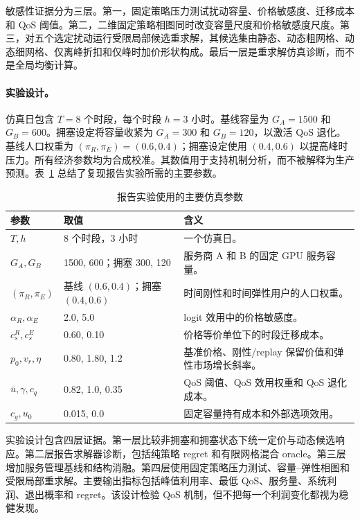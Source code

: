 \documentclass[UTF8,11pt,a4paper]{ctexart}
\begin{document}
敏感性证据分为三层。第一，固定策略压力测试扰动容量、价格敏感度、迁移成本和 QoS 阈值。第二，二维固定策略相图同时改变容量尺度和价格敏感度尺度。第三，对五个选定扰动运行受限局部候选重求解，其候选集由静态、动态粗网格、动态细网格、仅离峰折扣和仅峰时加价形状构成。最后一层是重求解仿真诊断，而不是全局均衡计算。

\paragraph{实验设计。}
\label{sec:setup}

仿真日包含 $T=8$ 个时段，每个时段 $h=3$ 小时。基线容量为 $G_A=1500$ 和 $G_B=600$。拥塞设定将容量收紧为 $G_A=300$ 和 $G_B=120$，以激活 QoS 退化。基线人口权重为 $(\pi_R,\pi_E)=(0.6,0.4)$；拥塞设定使用 $(0.4,0.6)$ 以提高峰时压力。所有经济参数均为合成校准。其数值用于支持机制分析，而不被解释为生产预测。表~\ref{tab:main_parameters} 总结了复现报告实验所需的主要参数。

\begin{table}[H]
\centering
\caption{报告实验使用的主要仿真参数}
\label{tab:main_parameters}
\small
\begin{tabular}{p{}p{}p{}}
\toprule
参数 & 取值 & 含义 \\
\midrule
$T,h$ & 8 个时段，3 小时 & 一个仿真日。 \\
$G_A,G_B$ & 1500, 600；拥塞 300, 120 & 服务商 A 和 B 的固定 GPU 服务容量。 \\
$(\pi_R,\pi_E)$ & 基线 $(0.6,0.4)$；拥塞 $(0.4,0.6)$ & 时间刚性和时间弹性用户的人口权重。 \\
$\alpha_R,\alpha_E$ & 2.0, 5.0 & logit 效用中的价格敏感度。 \\
$c_s^R,c_s^E$ & 0.60, 0.10 & 价格等价单位下的时段迁移成本。 \\
$p_0,v_r,\eta$ & 0.80, 1.80, 1.2 & 基准价格、刚性/replay 保留价值和弹性市场增长斜率。 \\
$\bar u,\gamma,c_q$ & 0.82, 1.0, 0.35 & QoS 阈值、QoS 效用权重和 QoS 退化成本。 \\
$c_g,u_0$ & 0.015, 0.0 & 固定容量持有成本和外部选项效用。 \\
\bottomrule
\end{tabular}
\end{table}

实验设计包含四层证据。第一层比较非拥塞和拥塞状态下统一定价与动态候选响应。第二层报告求解器诊断，包括纯策略 regret 和有限网格混合 oracle。第三层增加服务管理基线和结构消融。第四层使用固定策略压力测试、容量--弹性相图和受限局部重求解。主要输出指标包括峰值利用率、最低 QoS、服务量、系统利润、退出概率和 regret。该设计检验 QoS 机制，但不把每一个利润变化都视为稳健发现。
\end{document}
